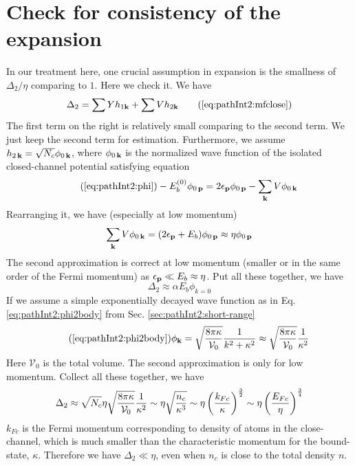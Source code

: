 \section{Check for consistency of the expansion\label{sec:pathApp:consistency}}
In our treatment here, one crucial assumption in expansion is the smallness of $\Delta_{2}/\eta$ comparing to $1$.  Here we check it.  We have 
\begin{equation}
\Delta_{2}=\sum{}Yh_{1\vk}+\sum{}Vh_{2\vk}\tag{\ref{eq:pathInt2:mfclose}}
\end{equation}
The first term on the right is relatively small comparing to the second term.  We just keep the second term for estimation.  Furthermore,  we assume $h_{2\,\mathbf{k}}=\sqrt{N_{c}}\phi_{0\,\mathbf{k}}$, where $\phi_{0\,\mathbf{k}}$ is the normalized wave function of the  isolated closed-channel potential satisfying \sch equation
\begin{equation}\tag{\ref{eq:pathInt2:phi}}
-E_{b}^{(0)}\phi_{0\,\vp}=2\epsilon_{\vp}\phi_{0\,\vp}-\sum_{\vk}V \phi_{0\,\vk}
\end{equation}
Rearranging it, we have (especially at low momentum)
\begin{equation*}
\sum_{\mathbf{k}}V \phi_{0\,\mathbf{k}}=(2\epsilon_{\mathbf{p}}+E_{b})\phi_{0\,\mathbf{p}}\approx{\eta}\phi_{0\,\mathbf{p}}
\end{equation*}
The second approximation is correct at low momentum (smaller or in the same order of the Fermi momentum) as $\epsilon_{\mathbf{p}}\ll{}E_{b}\approx\eta$.  Put all these together, we have
\begin{equation*}
\Delta_{2}\approx\alpha{}E_{b}\phi_{k=0}
\end{equation*}
If we assume a simple exponentially decayed wave function as in Eq. \ref{eq:pathInt2:phi2body} from Sec. \ref{sec:pathInt2:short-range}
\begin{equation}\tag{\ref{eq:pathInt2:phi2body}}
\phi_{\vk}=\sqrt{\frac{8\pi\kappa}{\mathcal{V}_{0}}}\frac{1}{k^{2}+\kappa^{2}}\approx\sqrt{\frac{8\pi\kappa}{\mathcal{V}_{0}}}\frac{1}{\kappa^{2}}
\end{equation}
Here  $\mathcal{V}_{0}$ is the total volume.  The second approximation is only for  low momentum.  Collect all these together, we have
\begin{equation}
\Delta_{2}\approx\sqrt{N_{c}}\eta\sqrt{\frac{8\pi\kappa}{\mathcal{V}_{0}}}\frac{1}{\kappa^{2}}
\sim\eta\sqrt\frac{n_{c}}{\kappa^{3}}
\sim\eta\left(\frac{k_{Fc}}{\kappa}\right)^{\frac{3}{2}}
\sim\eta\left(\frac{E_{Fc}}{\eta}\right)^{\frac{3}{4}}
\end{equation}
$k_{Fc}$ is the Fermi momentum corresponding to density of atoms in the close-channel, which is much smaller than the characteristic momentum for the bound-state, $\kappa$.   Therefore we have $\Delta_{2}\ll\eta$, even when $n_{c}$ is close to the total density $n$. 

